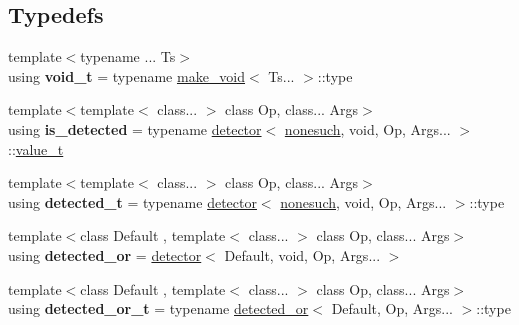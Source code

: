 \subsection*{Typedefs}
\begin{DoxyCompactItemize}
\item 
\mbox{\label{namespacenlohmann_1_1detail_a92a167c49c6697b6ffe4f79492c705e5}} 
{\footnotesize template$<$typename ... Ts$>$ }\\using {\bfseries void\+\_\+t} = typename \hyperlink{structnlohmann_1_1detail_1_1make__void}{make\+\_\+void}$<$ Ts... $>$\+::type
\item 
\mbox{\label{namespacenlohmann_1_1detail_a9135fcf616d6ac6e231a86e0a055ac44}} 
{\footnotesize template$<$template$<$ class... $>$ class Op, class... Args$>$ }\\using {\bfseries is\+\_\+detected} = typename \hyperlink{structnlohmann_1_1detail_1_1detector}{detector}$<$ \hyperlink{structnlohmann_1_1detail_1_1nonesuch}{nonesuch}, void, Op, Args... $>$\+::\hyperlink{namespacenlohmann_1_1detail_a1ed8fc6239da25abcaf681d30ace4985}{value\+\_\+t}
\item 
\mbox{\label{namespacenlohmann_1_1detail_a37e97a32d0b94ce5f745427e4e40204d}} 
{\footnotesize template$<$template$<$ class... $>$ class Op, class... Args$>$ }\\using {\bfseries detected\+\_\+t} = typename \hyperlink{structnlohmann_1_1detail_1_1detector}{detector}$<$ \hyperlink{structnlohmann_1_1detail_1_1nonesuch}{nonesuch}, void, Op, Args... $>$\+::type
\item 
\mbox{\label{namespacenlohmann_1_1detail_a240ce21919ab08e8a6cb3a5cfa412bce}} 
{\footnotesize template$<$class Default , template$<$ class... $>$ class Op, class... Args$>$ }\\using {\bfseries detected\+\_\+or} = \hyperlink{structnlohmann_1_1detail_1_1detector}{detector}$<$ Default, void, Op, Args... $>$
\item 
\mbox{\label{namespacenlohmann_1_1detail_a7ac5b8ef0363101275a2827b3b117dcf}} 
{\footnotesize template$<$class Default , template$<$ class... $>$ class Op, class... Args$>$ }\\using {\bfseries detected\+\_\+or\+\_\+t} = typename \hyperlink{structnlohmann_1_1detail_1_1detector}{detected\+\_\+or}$<$ Default, Op, Args... $>$\+::type

\end{DoxyCompactItemize}
